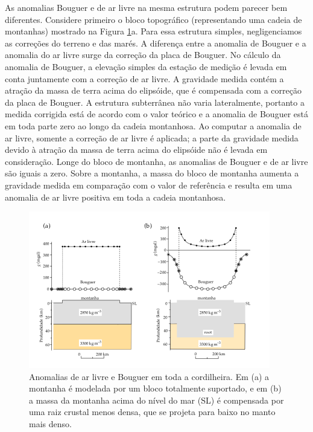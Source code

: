 \documentclass[]{book}
\theoremstyle{definition}
\theoremstyle{definition}
\theoremstyle{definition}
\theoremstyle{remark}
\begin{document}
As anomalias Bouguer e de ar livre na mesma estrutura podem parecer bem diferentes. Considere primeiro o bloco topográfico (representando uma cadeia de montanhas) mostrado na Figura \ref{fig:anomalias}a. Para essa estrutura simples, negligenciamos as correções do terreno e das marés. A diferença entre a anomalia de Bouguer e a anomalia do ar livre surge da correção da placa de Bouguer. No cálculo da anomalia de Bouguer, a elevação simples da estação de medição é levada em conta juntamente com a correção de ar livre. A gravidade medida contém a atração da massa de terra acima do elipsóide, que é compensada com a correção da placa de Bouguer. A estrutura subterrânea não varia lateralmente, portanto a medida corrigida está de acordo com o valor teórico e a anomalia de Bouguer está em toda parte zero ao longo da cadeia montanhosa. Ao computar a anomalia de ar livre, somente a correção de ar livre é aplicada; a parte da gravidade medida devido à atração da massa de terra acima do elipsóide não é levada em consideração. Longe do bloco de montanha, as anomalias de Bouguer e de ar livre são iguais a zero. Sobre a montanha, a massa do bloco de montanha aumenta a gravidade medida em comparação com o valor de referência e resulta em uma anomalia de ar livre positiva em toda a cadeia montanhosa.

\begin{figure}

{\centering \includegraphics[width=0.8\linewidth]{fig/Fig_02.36} 

}

\caption{Anomalias de ar livre e Bouguer em toda a cordilheira. Em (a) a montanha é modelada por um bloco totalmente suportado, e em (b) a massa da montanha acima do nível do mar (SL) é compensada por uma raiz crustal menos densa, que se projeta para baixo no manto mais denso.}\label{fig:anomalias}
\end{figure}
\end{document}
